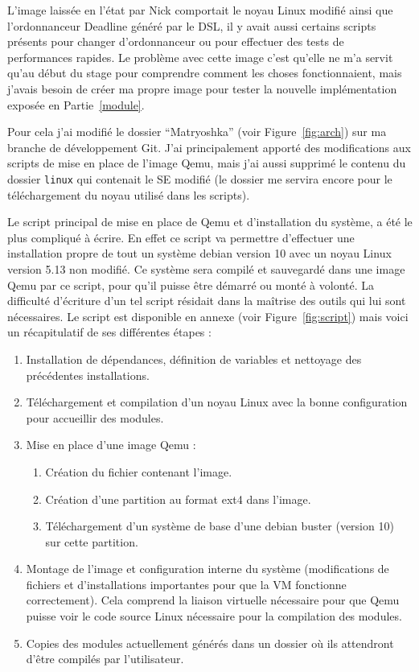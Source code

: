 L'image laissée en l'état par Nick comportait le noyau Linux modifié ainsi que l'ordonnanceur Deadline généré par le DSL, il y avait aussi certains scripts présents pour changer d'ordonnanceur ou pour effectuer des tests de performances rapides. Le problème avec cette image c'est qu'elle ne m'a servit qu'au début du stage pour comprendre comment les choses fonctionnaient, mais j'avais besoin de créer ma propre image pour tester la nouvelle implémentation exposée en Partie~\ref{module}.

Pour cela j'ai modifié le dossier ``Matryoshka'' (voir Figure~\ref{fig:arch}) sur ma branche de développement Git. J'ai principalement apporté des modifications aux scripts de mise en place de l'image Qemu, mais j'ai aussi supprimé le contenu du dossier \texttt{linux} qui contenait le SE modifié (le dossier me servira encore pour le téléchargement du noyau utilisé dans les scripts).

Le script principal de mise en place de Qemu et d'installation du système, a été le plus compliqué à écrire. En effet ce script va permettre d'effectuer une installation propre de tout un système debian version 10 avec un noyau Linux version 5.13 non modifié. Ce système sera compilé et sauvegardé dans une image Qemu par ce script, pour qu'il puisse être démarré ou monté à volonté. La difficulté d'écriture d'un tel script résidait dans la maîtrise des outils qui lui sont nécessaires. Le script est disponible en annexe (voir Figure~\ref{fig:script}) mais voici un récapitulatif de ses différentes étapes :

\begin{enumerate}
    \item Installation de dépendances, définition de variables et nettoyage des précédentes installations.
    \item Téléchargement et compilation d'un noyau Linux avec la bonne configuration pour accueillir des modules.
    \item Mise en place d'une image Qemu :
    \begin{enumerate}
        \item Création du fichier contenant l'image.
        \item Création d'une partition au format ext4 dans l'image.
        \item Téléchargement d'un système de base d'une debian buster (version 10) sur cette partition.
    \end{enumerate}
    \item Montage de l'image et configuration interne du système (modifications de fichiers et d'installations importantes pour que la VM fonctionne correctement). Cela comprend la liaison virtuelle nécessaire pour que Qemu puisse voir le code source Linux nécessaire pour la compilation des modules.
    \item Copies des modules actuellement générés dans un dossier où ils attendront d'être compilés par l'utilisateur.
\end{enumerate}

